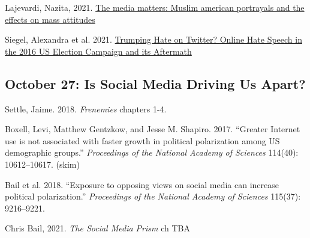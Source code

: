 \vspace{-.1in}\documentclass[11pt]{article}
\begin{document}
\noindent Lajevardi, Nazita, 2021. \href{https://www.journals.uchicago.edu/doi/full/10.1086/711300?casa_token=wITxV2WJeaQAAAAA:1wco3QZFwUnMq6EOzYON4LXw2XZUU-By0eeehfQq8QuDzgcUuQW93THNT8o7USkGF81ypdGHcHA}{The media matters: Muslim american portrayals and the effects on mass attitudes}

\noindent Siegel, Alexandra et al. 2021. \href{https://alexandra-siegel.com/wp-content/uploads/2019/08/qjps_election_hatespeech_RR.pdf}{Trumping Hate on Twitter? Online Hate Speech in the 2016 US Election Campaign and its Aftermath}






\subsection*{October 27: Is Social Media Driving Us Apart?}

\noindent Settle, Jaime. 2018. {\it Frenemies} chapters 1-4.

\noindent Boxell, Levi, Matthew Gentzkow, and Jesse M. Shapiro. 2017. ``Greater Internet use is not associated with faster growth in political polarization among US demographic groups.''
\emph{Proceedings of the National Academy of Sciences} 114(40): 10612--10617. (skim)


\noindent Bail et al. 2018. ``Exposure to opposing views on social media can increase political polarization.'' \emph{Proceedings of the National Academy of Sciences} 115(37): 9216--9221.

\noindent Chris Bail, 2021. \textit{The Social Media Prism} ch TBA



%
%
%
%
\end{document}
